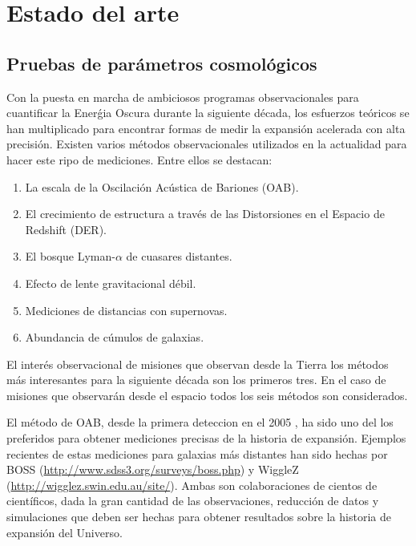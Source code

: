 
\section{Estado del arte}


\subsection{Pruebas de par\'ametros cosmol\'ogicos}
Con la puesta en marcha de ambiciosos programas observacionales para
cuantificar la Ener\'gia Oscura durante la siguiente d\'ecada, los
esfuerzos te\'oricos se han  multiplicado para encontrar formas de
medir la expansi\'on acelerada con alta precisi\'on. Existen varios
m\'etodos observacionales utilizados en la actualidad para hacer este
ripo de mediciones. Entre ellos se destacan:

\begin{enumerate}
\item La escala de la Oscilaci\'on Ac\'ustica de Bariones (OAB).
\item El crecimiento de estructura a trav\'es de las Distorsiones en
  el Espacio de Redshift (DER).
\item El bosque Lyman-$\alpha$ de cuasares distantes.
\item Efecto de lente gravitacional d\'ebil.
\item Mediciones de distancias con supernovas.
\item Abundancia de c\'umulos de galaxias.
\end{enumerate}

El inter\'es observacional de misiones que observan desde la Tierra
los m\'etodos m\'as interesantes para la siguiente d\'ecada son los
primeros tres. En el caso de misiones que observar\'an desde el
espacio todos los seis m\'etodos son considerados.

El m\'etodo de OAB, desde la primera deteccion en el 2005 \cite{Eisenstein2005},
ha sido uno del los preferidos para obtener mediciones precisas de la
historia de expansi\'on. Ejemplos recientes de estas mediciones
\cite{wigglez,BOSS} para
galaxias m\'as distantes han sido hechas por BOSS
(\url{http://www.sdss3.org/surveys/boss.php}) y WiggleZ
(\url{http://wigglez.swin.edu.au/site/}). Ambas son colaboraciones de
cientos de cient\'ificos, dada la gran cantidad de las observaciones,
reducci\'on de datos y simulaciones que deben ser hechas para obtener
resultados sobre la historia de expansi\'on del Universo.

